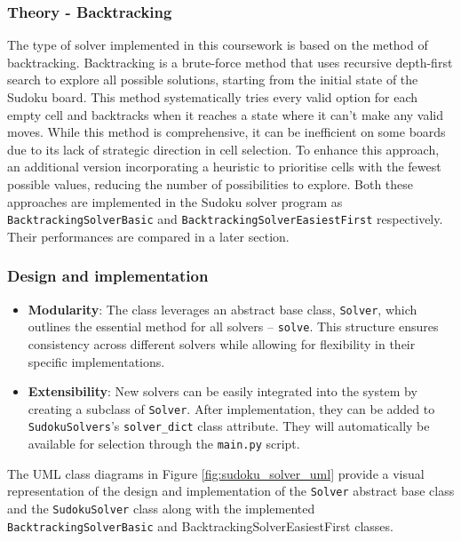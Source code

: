 \documentclass[11pt]{article}
\begin{document}
\subsubsection{Theory - Backtracking}
The type of solver implemented in this coursework is based on the method of backtracking. Backtracking is a brute-force method that uses recursive depth-first search to explore all possible solutions, starting from the initial state of the Sudoku board. This method systematically tries every valid option for each empty cell and backtracks when it reaches a state where it can't make any valid moves. While this method is comprehensive, it can be inefficient on some boards due to its lack of strategic direction in cell selection. To enhance this approach, an additional version incorporating a heuristic to prioritise cells with the fewest possible values, reducing the number of possibilities to explore. Both these approaches are implemented in the Sudoku solver program as \texttt{BacktrackingSolverBasic} and \texttt{BacktrackingSolverEasiestFirst} respectively. Their performances are compared in a later section.
\subsubsection{Design and implementation}
\begin{itemize}
    \item \textbf{Modularity}: The class leverages an abstract base class, \texttt{Solver}, which outlines the essential method for all solvers -- \texttt{solve}. This structure ensures consistency across different solvers while allowing for flexibility in their specific implementations.
    \item \textbf{Extensibility}: New solvers can be easily integrated into the system by creating a subclass of \texttt{Solver}. After implementation, they can be added to \texttt{SudokuSolvers}'s \texttt{solver\_dict} class attribute. They will automatically be available for selection through the \texttt{main.py} script.
\end{itemize}

The UML class diagrams in Figure \ref{fig:sudoku_solver_uml} provide a visual representation of the design and implementation of the \texttt{Solver} abstract base class and the \texttt{SudokuSolver} class along with the implemented \texttt{BacktrackingSolverBasic} and {BacktrackingSolverEasiestFirst} classes.
\end{document}
